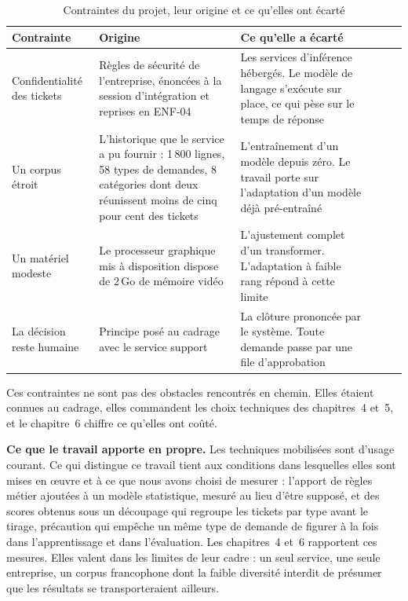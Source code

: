 \begin{table}[!htbp]
\centering
\singlespacing
\styletableau
\renewcommand{\arraystretch}{1.15}
\caption{Contraintes du projet, leur origine et ce qu'elles ont écarté}
\label{tab:contraintes1}
\begin{tabular}{|Bp{2.9cm}|Lp{5.4cm}|Lp{4.8cm}|}
\hline
{}
\textbf{Contrainte} & \textbf{Origine} & \textbf{Ce qu'elle a écarté} \\
\hline
Confidentialité des tickets &
Règles de sécurité de l'entreprise, énoncées à la session d'intégration et reprises en ENF-04 &
Les services d'inférence hébergés. Le modèle de langage s'exécute sur place, ce qui pèse sur le
temps de réponse \\
\hline
Un corpus étroit &
L'historique que le service a pu fournir : 1\,800 lignes, 58 types de demandes, 8 catégories dont
deux réunissent moins de cinq pour cent des tickets &
L'entraînement d'un modèle depuis zéro. Le travail porte sur l'adaptation d'un modèle déjà
pré-entraîné \\
\hline
Un matériel modeste &
Le processeur graphique mis à disposition dispose de 2\,Go de mémoire vidéo &
L'ajustement complet d'un transformer. L'adaptation à faible rang répond à cette limite \\
\hline
La décision reste humaine &
Principe posé au cadrage avec le service support &
La clôture prononcée par le système. Toute demande passe par une file d'approbation \\
\hline
\end{tabular}
\end{table}

Ces contraintes ne sont pas des obstacles rencontrés en chemin. Elles étaient connues au cadrage,
elles commandent les choix techniques des chapitres~4 et~5, et le chapitre~6 chiffre ce qu'elles ont
coûté.

\label{sec:positionnement2}

\textbf{Ce que le travail apporte en propre.} Les techniques mobilisées sont d'usage courant. Ce
qui distingue ce travail tient aux conditions dans lesquelles elles sont mises en œuvre et à ce que
nous avons choisi de mesurer : l'apport de règles métier ajoutées à un modèle statistique, mesuré au
lieu d'être supposé, et des scores obtenus sous un découpage qui regroupe les tickets par type avant
le tirage, précaution qui empêche un même type de demande de figurer à la fois dans l'apprentissage
et dans l'évaluation. Les chapitres~4 et~6 rapportent ces mesures. Elles valent dans les limites de
leur cadre : un seul service, une seule entreprise, un corpus francophone dont la faible diversité
interdit de présumer que les résultats se transporteraient ailleurs.

